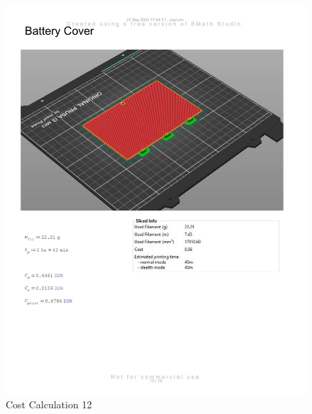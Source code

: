 \begin{figure}[H]
    \centering
    \includegraphics[width=\linewidth]{texs/appendix/data/cost1-12.jpg}
    \caption{Cost Calculation 12}
    \label{fig:cost-calculation-12}
\end{figure}

